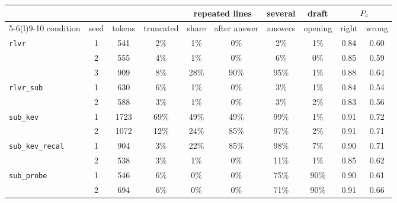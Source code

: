 \begin{tabular}{@{}lccccccccc@{}}
\toprule
 & & & & \multicolumn{2}{c}{repeated lines} & several & draft & \multicolumn{2}{c}{\kev{} $P_{\mathrm{c}}$} \\ \cmidrule(lr){5-6}\cmidrule(l){9-10}
condition & seed & tokens & truncated & share & after answer & answers & opening & right & wrong \\ \midrule
\texttt{rlvr} & 1 & 541 & 2\% & 1\% & 0\% & 2\% & 1\% & 0.84 & 0.60 \\
 & 2 & 555 & 4\% & 1\% & 0\% & 6\% & 0\% & 0.85 & 0.59 \\
 & 3 & 909 & 8\% & 28\% & 90\% & 95\% & 1\% & 0.88 & 0.64 \\
\addlinespace
\texttt{rlvr\_sub} & 1 & 630 & 6\% & 1\% & 0\% & 3\% & 1\% & 0.84 & 0.54 \\
 & 2 & 588 & 3\% & 1\% & 0\% & 3\% & 2\% & 0.83 & 0.56 \\
\addlinespace
\texttt{sub\_kev} & 1 & 1723 & 69\% & 49\% & 49\% & 99\% & 1\% & 0.91 & 0.72 \\
 & 2 & 1072 & 12\% & 24\% & 85\% & 97\% & 2\% & 0.91 & 0.71 \\
\addlinespace
\texttt{sub\_kev\_recal} & 1 & 904 & 3\% & 22\% & 85\% & 98\% & 7\% & 0.90 & 0.71 \\
 & 2 & 538 & 3\% & 1\% & 0\% & 11\% & 1\% & 0.85 & 0.62 \\
\addlinespace
\texttt{sub\_probe} & 1 & 546 & 6\% & 0\% & 0\% & 75\% & 90\% & 0.90 & 0.61 \\
 & 2 & 694 & 6\% & 0\% & 0\% & 71\% & 90\% & 0.91 & 0.66 \\
\bottomrule
\end{tabular}
